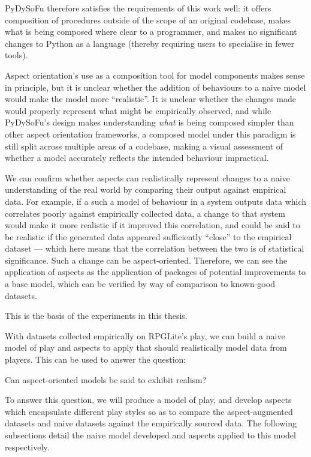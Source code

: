 PyDySoFu therefore satisfies the requirements of this work well: it offers
composition of procedures outside of the scope of an original codebase, makes
what is being composed where clear to a programmer, and makes no significant
changes to Python as a language (thereby requiring users to specialise in fewer
tools). 



Aspect orientation's use as a composition tool for model components makes sense
in principle, but it is unclear whether the addition of behaviours to a naive
model would make the model more ``realistic''. It is unclear whether the changes
made would properly represent what might be empirically observed, and while
PyDySoFu's design makes understanding \emph{what} is being composed simpler than
other aspect orientation frameworks, a composed model under this paradigm is
still split across multiple areas of a codebase, making a visual assessment of
whether a model accurately reflects the intended behaviour impractical. 

We can confirm whether aspects can realistically represent changes to a naive
understanding of the real world by comparing their output against empirical
data. For example, if a such a model of behaviour in a system outputs data which
correlates poorly against empirically collected data, a change to that system
would make it more realistic if it improved this correlation, and could be said
to be realistic if the generated data appeared sufficiently ``close'' to the
empirical dataset --- which here means that the correlation between the two is
of statistical significance. Such a change can be aspect-oriented. Therefore, we
can see the application of aspects as the application of packages of potential
improvements to a base model, which can be verified by way of comparison to
known-good datasets.

This is the basis of the experiments in this thesis.

With datasets collected empirically on RPGLite's play, we can build a naive
model of play and aspects to apply that should realistically model data from
players. This can be used to answer the question:

\begin{researchquestion}
    Can aspect-oriented models be said to exhibit realism?
\end{researchquestion}

To answer this question, we will produce a model of play, and develop aspects
which encapsulate different play styles so as to compare the aspect-augmented
datasets and naive datasets against the empirically sourced data. The following
subsections detail the naive model developed and aspects applied to this model
respectively.


